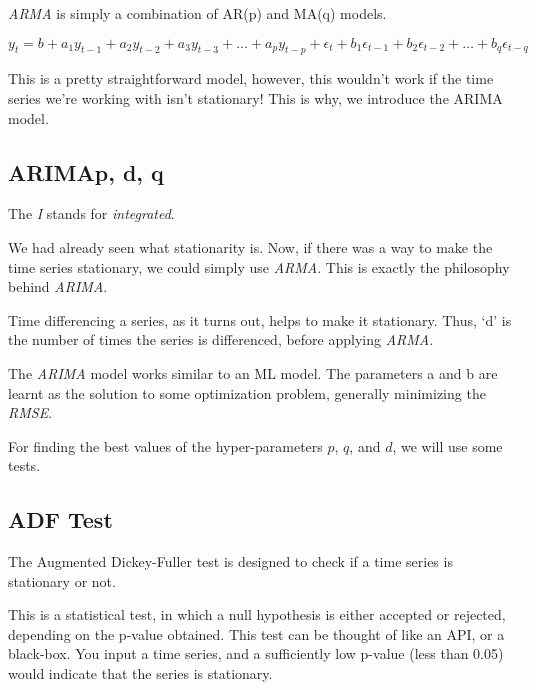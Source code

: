 \emph{ARMA} is simply a combination of AR(p) and MA(q) models.

\[
y_t = b + a_1 y_{t-1} + a_2 y_{t-2} + a_3 y_{t-3} + \dots + a_p y_{t-p} + \epsilon_t + b_1 \epsilon_{t-1} + b_2 \epsilon_{t-2} + \dots + b_q \epsilon_{t-q}
\]

This is a pretty straightforward model, however, this wouldn’t work if the time series we’re working with isn’t stationary! This is why, we introduce the ARIMA model.

\subsection{ARIMA{p, d, q}}

The \emph{I} stands for \emph{integrated}.

We had already seen what stationarity is. Now, if there was a way to make the time series stationary, we could simply use \emph{ARMA}. This is exactly the philosophy behind \emph{ARIMA}. 

Time differencing a series, as it turns out, helps to make it stationary. Thus, ‘d’ is the number of times the series is differenced, before applying \emph{ARMA}.

The \emph{ARIMA} model works similar to an ML model. The parameters a and b are learnt as the solution to some optimization problem, generally minimizing the \emph{RMSE}.

For finding the best values of the hyper-parameters $p$, $q$, and $d$, we will use some tests.


\subsection{ADF Test}

The Augmented Dickey-Fuller test is designed to check if a time series is stationary or not.

This is a statistical test, in which a null hypothesis is either accepted or rejected, depending on the p-value obtained. This test can be thought of like an API, or a black-box. You input a time series, and a sufficiently low p-value (less than 0.05) would indicate that the series is stationary.

